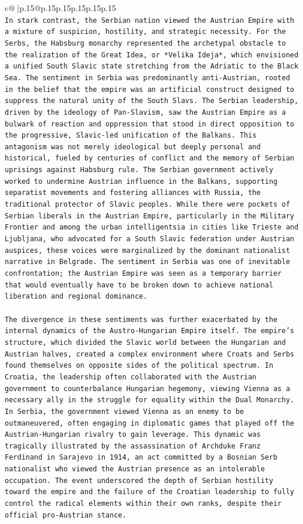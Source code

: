 \documentclass{article}
\begin{document}
{\begin{supertabular}{c@{$\;$}|p{.15\linewidth}@{}p{.15\linewidth}p{.15\linewidth}p{.15\linewidth}p{.15\linewidth}p{.15\linewidth}}
{{{\\ 
\texttt{In stark contrast, the Serbian nation viewed the Austrian Empire with a mixture of suspicion, hostility, and strategic necessity. For the Serbs, the Habsburg monarchy represented the archetypal obstacle to the realization of the Great Idea, or *Velika Ideja*, which envisioned a unified South Slavic state stretching from the Adriatic to the Black Sea. The sentiment in Serbia was predominantly anti{-}Austrian, rooted in the belief that the empire was an artificial construct designed to suppress the natural unity of the South Slavs. The Serbian leadership, driven by the ideology of Pan{-}Slavism, saw the Austrian Empire as a bulwark of reaction and oppression that stood in direct opposition to the progressive, Slavic{-}led unification of the Balkans. This antagonism was not merely ideological but deeply personal and historical, fueled by centuries of conflict and the memory of Serbian uprisings against Habsburg rule. The Serbian government actively worked to undermine Austrian influence in the Balkans, supporting separatist movements and fostering alliances with Russia, the traditional protector of Slavic peoples. While there were pockets of Serbian liberals in the Austrian Empire, particularly in the Military Frontier and among the urban intelligentsia in cities like Trieste and Ljubljana, who advocated for a South Slavic federation under Austrian auspices, these voices were marginalized by the dominant nationalist narrative in Belgrade. The sentiment in Serbia was one of inevitable confrontation; the Austrian Empire was seen as a temporary barrier that would eventually have to be broken down to achieve national liberation and regional dominance.} \\
\\ 
\texttt{The divergence in these sentiments was further exacerbated by the internal dynamics of the Austro{-}Hungarian Empire itself. The empire's structure, which divided the Slavic world between the Hungarian and Austrian halves, created a complex environment where Croats and Serbs found themselves on opposite sides of the political spectrum. In Croatia, the leadership often collaborated with the Austrian government to counterbalance Hungarian hegemony, viewing Vienna as a necessary ally in the struggle for equality within the Dual Monarchy. In Serbia, the government viewed Vienna as an enemy to be outmaneuvered, often engaging in diplomatic games that played off the Austrian{-}Hungarian rivalry to gain leverage. This dynamic was tragically illustrated by the assassination of Archduke Franz Ferdinand in Sarajevo in 1914, an act committed by a Bosnian Serb nationalist who viewed the Austrian presence as an intolerable occupation. The event underscored the depth of Serbian hostility toward the empire and the failure of the Croatian leadership to fully control the radical elements within their own ranks, despite their official pro{-}Austrian stance.} \\
}}}
\end{supertabular}}
\end{document}
